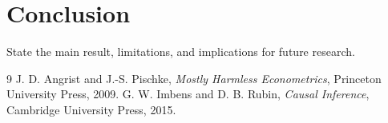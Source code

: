 \documentclass[11pt]{article}
\begin{document}
\section{Conclusion}
State the main result, limitations, and implications for future research.
\begin{thebibliography}{9}
 J. D. Angrist and J.-S. Pischke, \emph{Mostly Harmless
Econometrics}, Princeton University Press, 2009.
 G. W. Imbens and D. B. Rubin, \emph{Causal Inference},
Cambridge University Press, 2015.
\end{thebibliography}
\end{document}
